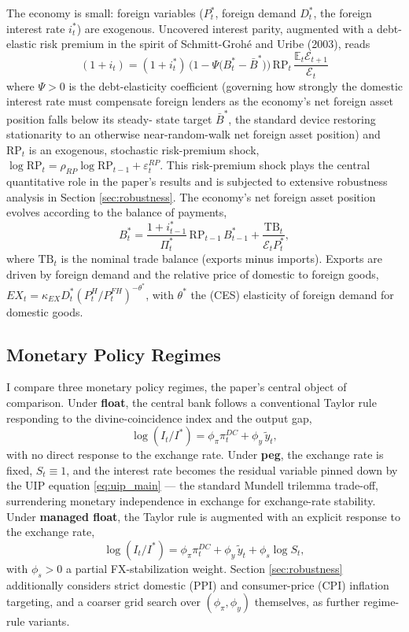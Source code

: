 \documentclass[12pt]{article}
\begin{document}
The economy is small: foreign variables ($P_t^*$, foreign demand $D_t^*$, the foreign interest rate
$i_t^*$) are exogenous. Uncovered interest parity, augmented with a debt-elastic risk premium in the
spirit of Schmitt-Grohé and Uribe (2003), reads
\begin{equation}
    (1+i_t) = (1+i_t^*)\,\Big(1-\Psi\big(B_t^*-\bar B^*\big)\Big)\,\mathrm{RP}_t\,\frac{\mathbb E_t\mathcal E_{t+1}}{\mathcal E_t}
    \label{eq:uip_main}
\end{equation}
where $\Psi>0$ is the debt-elasticity coefficient (governing how strongly the domestic interest rate
must compensate foreign lenders as the economy's net foreign asset position falls below its steady-
state target $\bar B^*$, the standard device restoring stationarity to an otherwise near-random-walk
net foreign asset position) and $\mathrm{RP}_t$ is an exogenous, stochastic risk-premium shock,
$\log\mathrm{RP}_t = \rho_{RP}\log\mathrm{RP}_{t-1}+\varepsilon_t^{RP}$. This risk-premium shock plays
the central quantitative role in the paper's results and is subjected to extensive robustness analysis
in Section \ref{sec:robustness}. The economy's net foreign asset position evolves according to the
balance of payments,
\begin{equation}
    B_t^* = \frac{1+i_{t-1}^*}{\Pi_t^*}\,\mathrm{RP}_{t-1}\,B_{t-1}^* + \frac{\mathrm{TB}_t}{\mathcal E_tP_t^*},
\end{equation}
where $\mathrm{TB}_t$ is the nominal trade balance (exports minus imports). Exports are driven by
foreign demand and the relative price of domestic to foreign goods, $EX_t = \kappa_{EX}D_t^*
(P_t^H/P_t^{FH})^{-\theta^*}$, with $\theta^*$ the (CES) elasticity of foreign demand for domestic
goods.

\subsection{Monetary Policy Regimes}

I compare three monetary policy regimes, the paper's central object of comparison. Under \textbf{float},
the central bank follows a conventional Taylor rule responding to the divine-coincidence index and the
output gap,
\begin{equation}
    \log(I_t/I^*) = \phi_\pi \pi_t^{DC} + \phi_y\,\tilde y_t, \tag{Float}
\end{equation}
with no direct response to the exchange rate. Under \textbf{peg}, the exchange rate is fixed,
$S_t\equiv1$, and the interest rate becomes the residual variable pinned down by the UIP equation
\eqref{eq:uip_main} --- the standard Mundell trilemma trade-off, surrendering monetary independence
in exchange for exchange-rate stability. Under \textbf{managed float}, the Taylor rule is augmented
with an explicit response to the exchange rate,
\begin{equation}
    \log(I_t/I^*) = \phi_\pi \pi_t^{DC} + \phi_y\,\tilde y_t + \phi_s\log S_t, \tag{Managed}
\end{equation}
with $\phi_s>0$ a partial FX-stabilization weight. Section \ref{sec:robustness} additionally
considers strict domestic (PPI) and consumer-price (CPI) inflation targeting, and a coarser grid
search over $(\phi_\pi,\phi_y)$ themselves, as further regime-rule variants.
\end{document}
